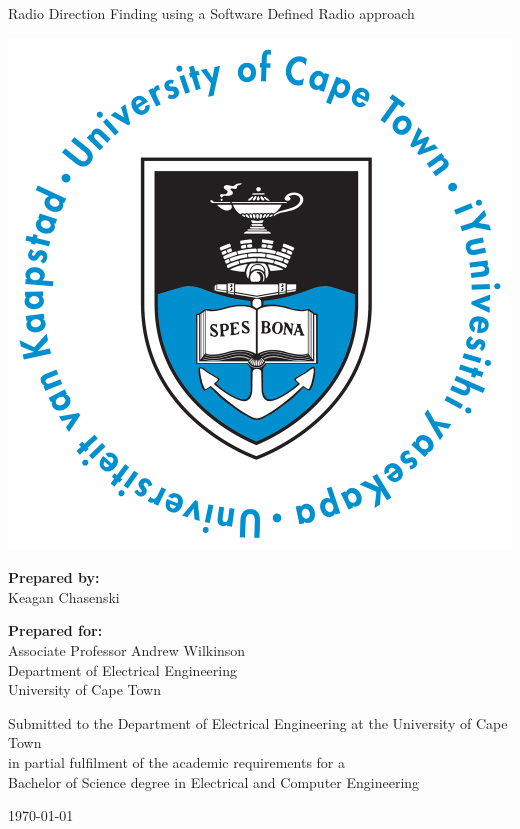 \thispagestyle{empty}
\begin{center}
    
\Huge

\vspace{5cm}

Radio Direction Finding using a Software Defined Radio approach

\vspace{2cm}

\includegraphics[width=0.4\linewidth]{FrontMatter/UCT_logo.png}

\vfill

\large
\textbf{Prepared by:}\\
Keagan Chasenski

\vspace{1cm}

\textbf{Prepared for:}\\
Associate Professor Andrew Wilkinson\\
Department of Electrical Engineering\\
University of Cape Town

\vspace{2cm}

\small
Submitted to the Department of Electrical Engineering at the University of Cape Town\\
in partial fulfilment of the academic requirements for a\\
Bachelor of Science degree in Electrical and Computer Engineering

\vspace{2cm}

\today

\end{center}